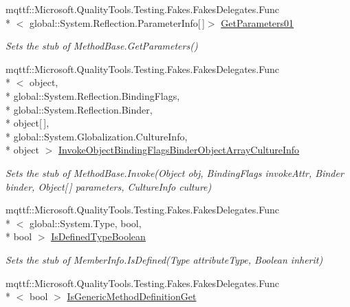\begin{DoxyCompactItemize}
mqttf\-::\-Microsoft.\-Quality\-Tools.\-Testing.\-Fakes.\-Fakes\-Delegates.\-Func\\*
$<$ global\-::\-System.\-Reflection.\-Parameter\-Info\mbox{[}$\,$\mbox{]}$>$ \hyperlink{class_system_1_1_reflection_1_1_fakes_1_1_stub_method_base_a8073ee7e38955decfacbd4bf26f19637}{Get\-Parameters01}
\begin{DoxyCompactList}\small\item\em Sets the stub of Method\-Base.\-Get\-Parameters()\end{DoxyCompactList}\item 
mqttf\-::\-Microsoft.\-Quality\-Tools.\-Testing.\-Fakes.\-Fakes\-Delegates.\-Func\\*
$<$ object, \\*
global\-::\-System.\-Reflection.\-Binding\-Flags, \\*
global\-::\-System.\-Reflection.\-Binder, \\*
object\mbox{[}$\,$\mbox{]}, \\*
global\-::\-System.\-Globalization.\-Culture\-Info, \\*
object $>$ \hyperlink{class_system_1_1_reflection_1_1_fakes_1_1_stub_method_base_aa17fc9a075d867d17239ee4596a49ba2}{Invoke\-Object\-Binding\-Flags\-Binder\-Object\-Array\-Culture\-Info}
\begin{DoxyCompactList}\small\item\em Sets the stub of Method\-Base.\-Invoke(\-Object obj, Binding\-Flags invoke\-Attr, Binder binder, Object\mbox{[}$\,$\mbox{]} parameters, Culture\-Info culture)\end{DoxyCompactList}\item 
mqttf\-::\-Microsoft.\-Quality\-Tools.\-Testing.\-Fakes.\-Fakes\-Delegates.\-Func\\*
$<$ global\-::\-System.\-Type, bool, \\*
bool $>$ \hyperlink{class_system_1_1_reflection_1_1_fakes_1_1_stub_method_base_ab141d82bf0df35e233aad5852b4cdf42}{Is\-Defined\-Type\-Boolean}
\begin{DoxyCompactList}\small\item\em Sets the stub of Member\-Info.\-Is\-Defined(\-Type attribute\-Type, Boolean inherit)\end{DoxyCompactList}\item 
mqttf\-::\-Microsoft.\-Quality\-Tools.\-Testing.\-Fakes.\-Fakes\-Delegates.\-Func\\*
$<$ bool $>$ \hyperlink{class_system_1_1_reflection_1_1_fakes_1_1_stub_method_base_aeb6fe87e219ab243cf04b782b873fc30}{Is\-Generic\-Method\-Definition\-Get}

\end{DoxyCompactItemize}
